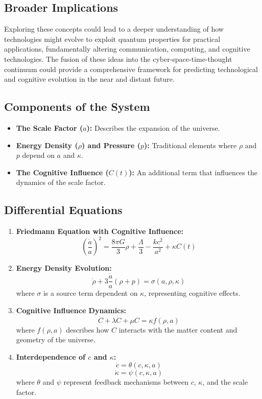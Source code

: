 \documentclass{article}
\begin{document}
\subsection*{Broader Implications}

Exploring these concepts could lead to a deeper understanding of how technologies might evolve to exploit quantum properties for practical applications, fundamentally altering communication, computing, and cognitive technologies. The fusion of these ideas into the cyber-space-time-thought continuum could provide a comprehensive framework for predicting technological and cognitive evolution in the near and distant future.
\subsection*{Components of the System}
\begin{itemize}
    \item \textbf{The Scale Factor (\( a \)):} Describes the expansion of the universe.
    \item \textbf{Energy Density (\( \rho \)) and Pressure (\( p \)):} Traditional elements where \( \rho \) and \( p \) depend on \( a \) and \( \kappa \).
    \item \textbf{The Cognitive Influence (\( C(t) \)):} An additional term that influences the dynamics of the scale factor.
\end{itemize}

\subsection*{Differential Equations}

\begin{enumerate}
    \item \textbf{Friedmann Equation with Cognitive Influence:}
    \[
    \left(\frac{\dot{a}}{a}\right)^2 = \frac{8\pi G}{3}\rho + \frac{\Lambda}{3} - \frac{kc^2}{a^2} + \kappa C(t)
    \]

    \item \textbf{Energy Density Evolution:}
    \[
    \dot{\rho} + 3\frac{\dot{a}}{a}(\rho + p) = \sigma(a, \rho, \kappa)
    \]
    where \( \sigma \) is a source term dependent on \( \kappa \), representing cognitive effects.

    \item \textbf{Cognitive Influence Dynamics:}
    \[
    \ddot{C} + \lambda \dot{C} + \mu C = \kappa f(\rho, a)
    \]
    where \( f(\rho, a) \) describes how \( C \) interacts with the matter content and geometry of the universe.

    \item \textbf{Interdependence of \( c \) and \( \kappa \):}
    \[
    \dot{c} = \theta(c, \kappa, a)
    \]
    \[
    \dot{\kappa} = \psi(c, \kappa, a)
    \]
    where \( \theta \) and \( \psi \) represent feedback mechanisms between \( c \), \( \kappa \), and the scale factor.
\end{enumerate}
\end{document}
